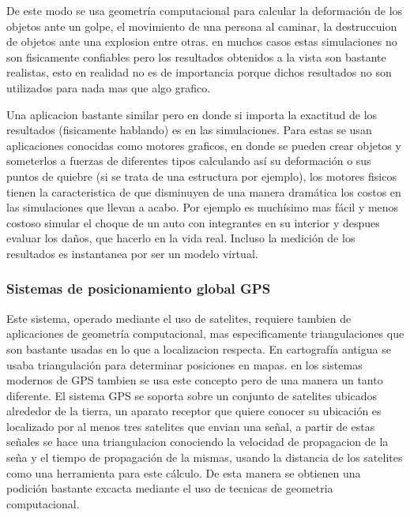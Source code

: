 \documentclass[final, 12pt letterpaper]{article}
\begin{document}
De este modo se usa geometría computacional para calcular la deformación de los objetos ante un golpe, el movimiento de una persona al caminar, la destruccuion de objetos ante una explosion entre otras. en muchos casos estas simulaciones no son fisicamente confiables pero los resultados obtenidos a la vista son bastante realistas, esto en realidad no es de importancia porque dichos resultados no son utilizados para nada mas que algo grafico.

Una aplicacion bastante similar pero en donde si importa la exactitud de los resultados (fisicamente hablando) es en las simulaciones. Para estas se usan aplicaciones conocidas como motores graficos, en donde se pueden crear objetos y someterlos a fuerzas de diferentes tipos calculando así su deformación o sus puntos de quiebre (si se trata de una estructura por ejemplo), los motores fisicos tienen la caracteristica de que disminuyen de una manera dramática los costos en las simulaciones que llevan a acabo. Por ejemplo es muchísimo mas fácil y menos costoso simular el choque de un auto con integrantes en su interior y despues evaluar los daños, que hacerlo en la vida real. Incluso la medición de los resultados es instantanea por ser un modelo virtual.


\subsubsection*{Sistemas de posicionamiento global GPS}
Este sistema, operado mediante el uso de satelites, requiere tambien de aplicaciones de geometría computacional, mas especificamente triangulaciones que son bastante usadas en lo que a localizacion respecta.
En cartografía antigua se usaba triangulación para determinar posiciones en mapas. en los sistemas modernos de GPS tambien se usa este concepto pero de una manera un tanto diferente.
El sistema GPS se soporta sobre un conjunto de satelites ubicados alrededor de la tierra, un aparato receptor que quiere conocer su ubicación es localizado por al menos tres satelites que envian una señal, a partir de estas señales se hace una triangulacion conociendo la velocidad de propagacion de la seña y el tiempo de propagación de la mismas, usando la distancia de los satelites como una herramienta para este cálculo.
De esta manera se obtienen una podición bastante excacta mediante el uso de tecnicas de geometria computacional.
\end{document}
